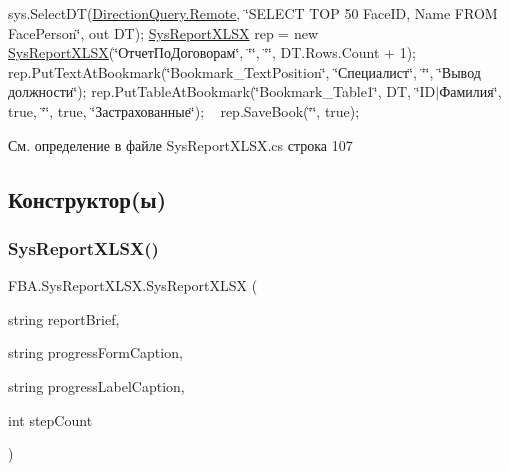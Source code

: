 sys.\+Select\+DT(\mbox{\hyperlink{namespace_f_b_a_a6ff7d5c242d98046d1980715b06d7300af8508f576cd3f742dfc268258dcdf0dd}{Direction\+Query.\+Remote}}, \char`\"{}\+S\+E\+L\+E\+C\+T T\+O\+P 50 Face\+I\+D, Name F\+R\+O\+M Face\+Person\char`\"{}, out DT); \mbox{\hyperlink{class_f_b_a_1_1_sys_report_x_l_s_x}{Sys\+Report\+X\+L\+SX}} rep = new \mbox{\hyperlink{class_f_b_a_1_1_sys_report_x_l_s_x}{Sys\+Report\+X\+L\+SX}}(\char`\"{}ОтчетПоДоговорам\char`\"{}, \char`\"{}\char`\"{}, \char`\"{}\char`\"{}, D\+T.\+Rows.\+Count + 1); ~\newline
rep.\+Put\+Text\+At\+Bookmark(\char`\"{}\+Bookmark\+\_\+\+Text\+Position\char`\"{}, \char`\"{}Специалист\char`\"{}, \char`\"{}\char`\"{}, \char`\"{}Вывод должности\char`\"{}); rep.\+Put\+Table\+At\+Bookmark(\char`\"{}\+Bookmark\+\_\+\+Table1\char`\"{}, DT, \char`\"{}\+I\+D$\vert$Фамилия\char`\"{}, true, \char`\"{}\char`\"{}, true, \char`\"{}Застрахованные\char`\"{}); ~\newline
rep.\+Save\+Book(\char`\"{}\char`\"{}, true); 

См. определение в файле Sys\+Report\+X\+L\+S\+X.\+cs строка 107



\subsection{Конструктор(ы)}
\mbox{\label{class_f_b_a_1_1_sys_report_x_l_s_x_a69cf2c47ee5bbf078239d0c972f6c136}} 
\subsubsection{\texorpdfstring{Sys\+Report\+X\+L\+S\+X()}{SysReportXLSX()}}
{\footnotesize\ttfamily F\+B\+A.\+Sys\+Report\+X\+L\+S\+X.\+Sys\+Report\+X\+L\+SX (\begin{DoxyParamCaption}\item[{string}]{report\+Brief,  }\item[{string}]{progress\+Form\+Caption,  }\item[{string}]{progress\+Label\+Caption,  }\item[{int}]{step\+Count }\end{DoxyParamCaption})}



